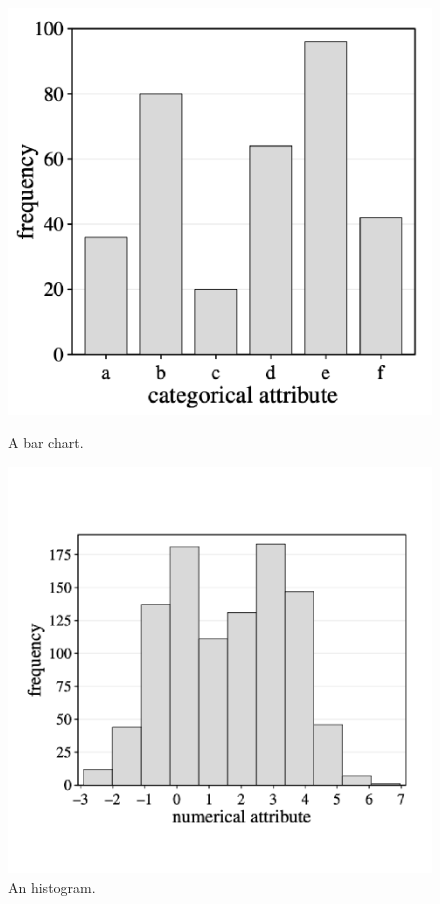 \begin{figure}[ht]
    \centering
    \begin{minipage}[b]{0.40\textwidth}
        \includegraphics[width=\textwidth]{img/bar chart.png}
        \caption{A bar chart.}
    \end{minipage}
    \hfill
    \begin{minipage}[b]{0.45\textwidth}
        \includegraphics[width=\textwidth]{img/histogram.png}
        \caption{An histogram.}
    \end{minipage}
\end{figure}


